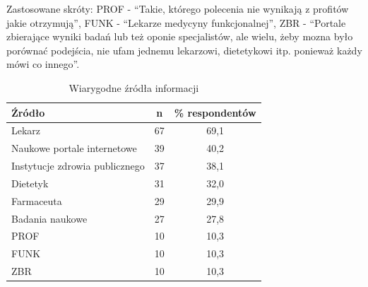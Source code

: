 \begin{table}[H]
    \centering
    \caption{Wiarygodne źródła informacji}
    \begin{minipage}{\textwidth}
        \vspace{0,1cm}
        Zastosowane skróty: PROF - \enquote{Takie, którego polecenia nie wynikają z profitów jakie otrzymują}, FUNK - \enquote{Lekarze medycyny funkcjonalnej}, ZBR - \enquote{Portale zbierające wyniki badań lub też oponie specjalistów, ale wielu, żeby mozna było porównać podejścia, nie ufam jednemu lekarzowi, dietetykowi itp. ponieważ każdy mówi co innego}.
    \end{minipage}
    \label{tab:wiarygodne-zrodla}
    \begin{tabular}{|l|c|c|}
        \hline
        \textbf{Źródło} & \textbf{n} & \textbf{\% respondentów} \\
        \hline
        \hline
        Lekarz & 67 & 69,1 \\
        \hline
        Naukowe portale internetowe & 39 & 40,2 \\
        \hline
        Instytucje zdrowia publicznego & 37 & 38,1 \\
        \hline
        Dietetyk & 31 & 32,0 \\
        \hline
        Farmaceuta & 29 & 29,9 \\
        \hline
        Badania naukowe & 27 & 27,8 \\
        \hline
        PROF & 10 & 10,3 \\
        \hline
        FUNK & 10  & 10,3 \\
        \hline
        ZBR & 10  & 10,3 \\
        \hline
    \end{tabular}
\end{table}



